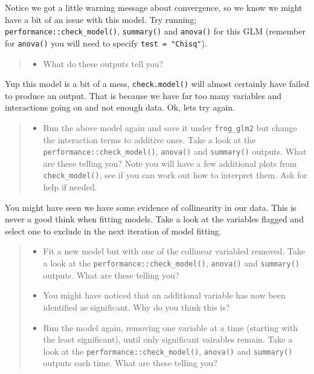 \documentclass[
]{book}
\providecommand{\tightlist}{%
  \setlength{\itemsep}{0pt}\setlength{\parskip}{0pt}}
\begin{document}
Notice we got a little warning message about convergence, so we know we might have a bit of an issue with this model. Try running; \texttt{performance::check\_model()}, \texttt{summary()} and \texttt{anova()} for this GLM (remember for \texttt{anova()} you will need to specify \texttt{test\ =\ "Chisq"}).

\begin{quote}
\begin{itemize}
\tightlist
\item
  What do these outputs tell you?
\end{itemize}
\end{quote}

Yup this model is a bit of a mess, \texttt{check.model()} will almost certainly have failed to produce an output. That is because we have far too many variables and interactions going on and not enough data. Ok, lets try again.

\begin{quote}
\begin{itemize}
\tightlist
\item
  Run the above model again and save it under \texttt{frog\_glm2} but change the interaction terms to additive ones. Take a look at the \texttt{performance::check\_model()}, \texttt{anova()} and \texttt{summary()} outputs. What are these telling you? Note you will have a few additional plots from \texttt{check\_model()}, see if you can work out how to interpret them. Ask for help if needed.
\end{itemize}
\end{quote}

You might have seen we have some evidence of collinearity in our data. This is never a good think when fitting models. Take a look at the variables flagged and select one to exclude in the next iteration of model fitting.

\begin{quote}
\begin{itemize}
\tightlist
\item
  Fit a new model but with one of the collinear variabled removed. Take a look at the \texttt{performance::check\_model()}, \texttt{anova()} and \texttt{summary()} outputs. What are these telling you?
\item
  You might have noticed that an additional variable has now been identified as significant. Why do you think this is?
\item
  Run the model again, removing one variable at a time (starting with the least significant), until only significant vairables remain. Take a look at the \texttt{performance::check\_model()}, \texttt{anova()} and \texttt{summary()} outputs each time. What are these telling you?
\end{itemize}
\end{quote}
\end{document}
